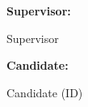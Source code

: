 \documentclass[a4paper,12pt]{report}
\begin{document}
\begin{titlepage}
\begin{center}
    \raggedright\textbf{\large Supervisor:} \\
    \raggedright\large Supervisor\\
    \vfill
    \raggedright\textbf{\large Candidate:} \\
    \raggedright\large Candidate (ID)\\

    \vfill

    \end{center}
\end{titlepage}

\begin{abstract}

\end{abstract}

\tableofcontents
\clearpage

\printbibliography
\end{document}
